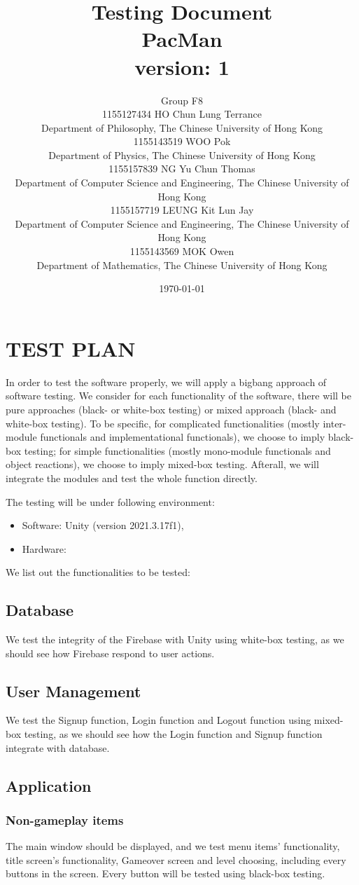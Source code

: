 \documentclass[11pt]{article}
\title{Testing Document\\PacMan\\version: 1}
\author{Group F8\\1155127434 HO Chun Lung Terrance\\
Department of Philosophy, The Chinese University of Hong Kong\\1155143519 WOO Pok\\
Department of Physics, The Chinese University of Hong Kong\\1155157839 NG Yu Chun Thomas\\
Department of Computer Science and Engineering, The Chinese University of Hong Kong\\1155157719 LEUNG Kit Lun Jay\\
Department of Computer Science and Engineering, The Chinese University of Hong Kong\\1155143569 MOK Owen\\
Department of Mathematics, The Chinese University of Hong Kong}
\date{\today}
\begin{document}
    \maketitle
    \tableofcontents
    \newpage

    \section{TEST PLAN}
    In order to test the software properly, we will apply a bigbang approach of software testing. We consider for each functionality of the software, there will be pure approaches (black- or white-box testing) or mixed approach (black- and white-box testing). To be specific, for complicated functionalities (mostly inter-module functionals and implementational functionals), we choose to imply black-box testing; for simple functionalities (mostly mono-module functionals and object reactions), we choose to imply mixed-box testing. Afterall, we will integrate the modules and test the whole function directly.

    The testing will be under following environment:
    \begin{itemize}
        \item Software: Unity (version 2021.3.17f1),
        \item Hardware: 
    \end{itemize}

    We list out the functionalities to be tested:

    \subsection*{Database}
    We test the integrity of the Firebase with Unity using white-box testing, as we should see how Firebase respond to user actions.

    \subsection*{User Management}
    We test the Signup function, Login function and Logout function using mixed-box testing, as we should see how the Login function and Signup function integrate with database.

    \subsection*{Application}
    \subsubsection*{Non-gameplay items}
    The main window should be displayed, and we test menu items' functionality, title screen's functionality, Gameover screen and level choosing, including every buttons in the screen. Every button will be tested using black-box testing.
\end{document}

